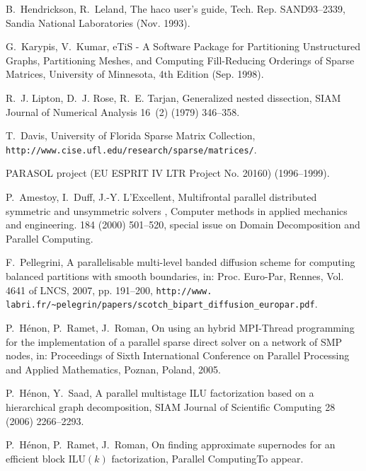 \documentclass[fleqn,12pt,twoside]{article}
\newcommand{\lbt}{\linebreak[2]}
\begin{document}
\begin{thebibliography}{10}
B.~Hendrickson, R.~Leland, The {haco} user's guide, Tech. Rep.
  SAND93--2339, {S}andia {N}ational {L}aboratories (Nov. 1993).

G.~Karypis, V.~Kumar, {e{T}i{S}} - A Software Package for Partitioning
  Unstructured Graphs, Partitioning Meshes, and Computing Fill-Reducing
  Orderings of Sparse Matrices, University of Minnesota, 4th Edition (Sep.
  1998).

R.~J. Lipton, D.~J. Rose, R.~E. Tarjan, Generalized nested dissection, {SIAM}
  Journal of Numerical Analysis 16~(2) (1979) 346--358.

T.~Davis, {U}niversity of {F}lorida {S}parse {M}atrix {C}ollection, {\tt
  http://\lbt www.\lbo cise.\lbt ufl.\lbo edu/\lbt research/\lbt sparse/\lbt
  matrices/}.

{PARASOL} project ({EU} {ESPRIT} {IV} {LTR} {P}roject {N}o. 20160)
  (1996--1999).

P.~Amestoy, I.~Duff, J.-Y. L'Excellent, {Multifrontal parallel distributed
  symmetric and unsymmetric solvers }, Computer methods in applied mechanics
  and engineering. 184 (2000) 501--520, special issue on Domain Decomposition
  and Parallel Computing.

F.~Pellegrini, A parallelisable multi-level banded diffusion scheme for
  computing balanced partitions with smooth boundaries, in: Proc\@. Euro-Par,
  Rennes, Vol. 4641 of LNCS, 2007, pp. 191--200, {\tt http://\lbt www.\lbo
  labri.\lbo fr/\lbt \~{}pelegrin/\lbt papers/\lbt scotch\_\lbt bipart\_\lbt
  diffusion\_\lbt europar\lbt 2007.\lbt pdf}.

P.~H\'enon, P.~Ramet, J.~Roman, On using an hybrid {MPI-Thread} programming for
  the implementation of a parallel sparse direct solver on a network of {SMP}
  nodes, in: Proceedings of Sixth International Conference on Parallel
  Processing and Applied Mathematics, Poznan, Poland, 2005.

P.~H\'enon, Y.~Saad, A parallel multistage {ILU} factorization based on a
  hierarchical graph decomposition, {SIAM} {J}ournal of {S}cientific
  {C}omputing 28 (2006) 2266--2293.

P.~H\'enon, P.~Ramet, J.~Roman, On finding approximate supernodes for an
  efficient block {ILU}$(k)$ factorization, Parallel ComputingTo appear.

\end{thebibliography}
\end{document}
